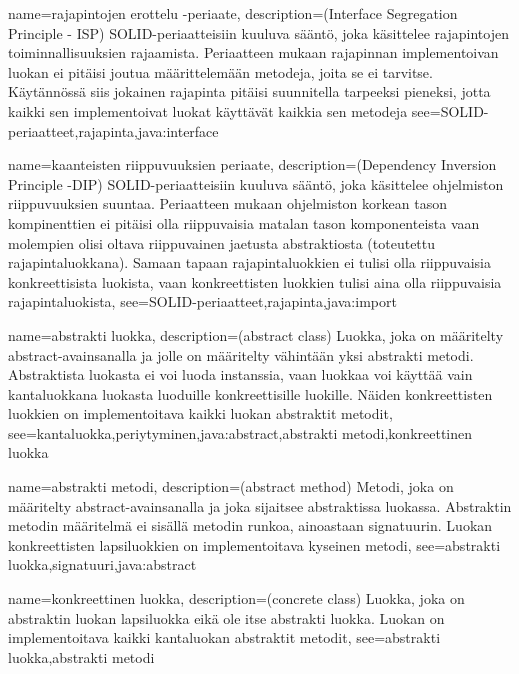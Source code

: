 {
	name=rajapintojen erottelu -periaate,
	description={(Interface Segregation Principle - ISP) SOLID-periaatteisiin kuuluva sääntö, joka
käsittelee rajapintojen toiminnallisuuksien rajaamista. Periaatteen mukaan rajapinnan
implementoivan luokan ei pitäisi joutua määrittelemään metodeja, joita se ei tarvitse. Käytännössä
siis jokainen rajapinta pitäisi suunnitella tarpeeksi pieneksi, jotta kaikki sen implementoivat
luokat käyttävät kaikkia sen metodeja}
	see={SOLID-periaatteet,rajapinta,java:interface}
}

{
	name=kaanteisten riippuvuuksien periaate,
	description={(Dependency Inversion Principle -DIP) SOLID-periaatteisiin kuuluva sääntö, joka
käsittelee ohjelmiston riippuvuuksien suuntaa. Periaatteen mukaan ohjelmiston korkean tason
kompinenttien ei pitäisi olla riippuvaisia matalan tason komponenteista vaan molempien olisi
oltava riippuvainen jaetusta abstraktiosta (toteutettu rajapintaluokkana). Samaan tapaan
rajapintaluokkien ei tulisi olla riippuvaisia konkreettisista luokista, vaan konkreettisten 
luokkien tulisi aina olla riippuvaisia rajapintaluokista},
	see={SOLID-periaatteet,rajapinta,java:import}
}

{
	name=abstrakti luokka,
	description={(abstract class) Luokka, joka on määritelty abstract-avainsanalla ja jolle on
määritelty vähintään yksi abstrakti metodi. Abstraktista luokasta ei voi luoda instanssia, vaan
luokkaa voi käyttää vain kantaluokkana luokasta luoduille konkreettisille luokille. Näiden
konkreettisten luokkien on implementoitava kaikki luokan abstraktit metodit},
	see={kantaluokka,periytyminen,java:abstract,abstrakti metodi,konkreettinen luokka}
}

{
	name=abstrakti metodi,
	description={(abstract method) Metodi, joka on määritelty abstract-avainsanalla ja joka
sijaitsee abstraktissa luokassa. Abstraktin metodin määritelmä ei sisällä metodin runkoa,
ainoastaan signatuurin. Luokan konkreettisten lapsiluokkien on implementoitava kyseinen metodi},
	see={abstrakti luokka,signatuuri,java:abstract}
}

{
	name=konkreettinen luokka,
	description={(concrete class) Luokka, joka on abstraktin luokan lapsiluokka eikä ole itse
abstrakti luokka. Luokan on implementoitava kaikki kantaluokan abstraktit metodit},
	see={abstrakti luokka,abstrakti metodi}
}

